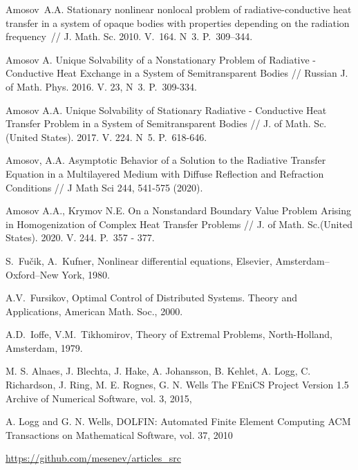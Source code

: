 \begin{thebibliography}{999}
    Amosov~A.A. Stationary nonlinear nonlocal problem of
    radiative-conductive heat transfer in a system of opaque bodies
    with properties depending on the radiation frequency~// J\@.
    Math. Sc. 2010. V.~164. N~3. P.~309--344.

    Amosov A. Unique Solvability of a Nonstationary Problem of Radiative - Conductive
    Heat Exchange in a System of Semitransparent Bodies // Russian J. of Math.
    Phys. 2016. V. 23, N~3. P.~309-334.

    Amosov A.A. Unique Solvability of Stationary Radiative - Conductive Heat Transfer
    Problem in a System of Semitransparent Bodies // J. of Math. Sc.(United
    States). 2017. V. 224. N~5. P.~618-646.

    Amosov, A.A. Asymptotic Behavior of a Solution to the Radiative Transfer Equation in a Multilayered Medium with Diffuse Reflection and Refraction Conditions // J Math Sci 244, 541-575 (2020).

    Amosov A.A., Krymov N.E. On a Nonstandard Boundary Value Problem Arising in Homogenization of Complex Heat Transfer Problems // J. of Math. Sc.(United
    States). 2020. V. 244. P.~357 - 377.




     S.~Fu\v{c}ik, A.~Kufner, Nonlinear differential equations,
    Elsevier, Amsterdam--Oxford--New York, 1980.

     A.V.~Fursikov, Optimal Control of Distributed
    Systems. Theory and Applications, American Math. Soc., 2000.

     A.D.~Ioffe, V.M.~Tikhomirov, Theory of Extremal
    Problems, North-Holland, Amsterdam, 1979.

     M. S. Alnaes, J. Blechta, J. Hake, A. Johansson,
    B. Kehlet, A. Logg, C. Richardson, J. Ring, M. E. Rognes, G. N. Wells
    The FEniCS Project Version 1.5
    Archive of Numerical Software, vol. 3, 2015,

     A. Logg and G. N. Wells, DOLFIN: Automated Finite Element Computing
    ACM Transactions on Mathematical Software, vol. 37, 2010

     \url{https://github.com/mesenev/articles_src}


\end{thebibliography}
